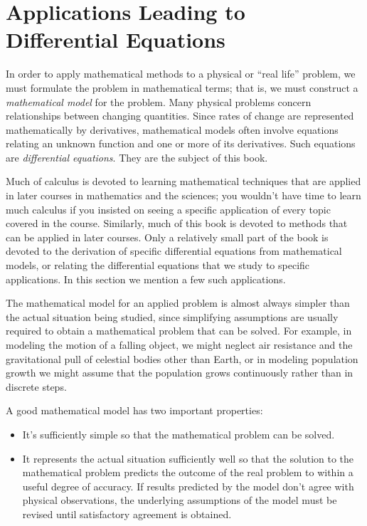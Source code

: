 \section{Applications Leading to Differential Equations}

\noindent
In order to apply mathematical methods to a physical or ``real life'' problem, we must formulate the problem in mathematical terms; that is, we must construct a {\color{blue}\it mathematical model\/} for the problem. Many physical problems concern relationships between changing quantities. Since rates of change are represented mathematically by derivatives, mathematical models often involve equations relating an unknown function and one or more of its derivatives. Such equations are {\color{blue}\it differential equations}. They are the subject of this book.

Much of calculus is devoted to learning mathematical techniques that are applied in later courses in mathematics and the sciences; you wouldn't have time to learn much calculus if you insisted on seeing a specific application of every topic covered in the course. Similarly, much of this book is devoted to methods that can be applied in later courses. Only a relatively small part of the book is devoted to the derivation of specific differential equations from mathematical models, or relating the differential equations that we study to specific applications. In this section we mention a few such applications.

The mathematical model for an applied problem is almost always simpler than the actual situation being studied, since simplifying assumptions are usually required to obtain a mathematical problem that can be solved. For example, in modeling the motion of a falling object, we might neglect air resistance and the gravitational pull of celestial bodies other than Earth, or in modeling population growth we might assume that the population grows continuously rather than in discrete steps.

A good mathematical model has two important properties:

\begin{itemize}
  \item It's sufficiently simple so that the mathematical problem can be solved.

  \item It represents the actual situation sufficiently well so that the solution to the mathematical problem predicts the outcome of the real problem to within a useful degree of accuracy. If results predicted by the model don't agree with physical observations, the underlying assumptions of the model must be revised until satisfactory agreement is obtained.
\end{itemize}

